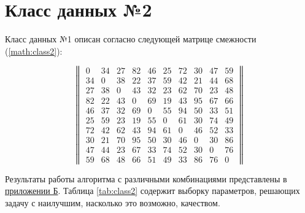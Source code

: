 \section{Класс данных №2}

Класс данных №1 описан согласно следующей матрице смежности (\ref{math:class2}): 

\begin{equation}\label{math:class2}
	\begin{Vmatrix}
		0  & 34 & 27 &  82 &  46 &  25&  72 &  30 &  47 &  59  \\
		34 & 0  & 38 &  22 &  37 &  59&  42 &  21 &  44 &  68  \\
		27 & 38 & 0  & 43  & 32  & 23 & 62  & 70  & 23  & 48  \\
		82 & 22 & 43 &  0  & 69  & 19 & 43  & 95  & 67  & 66  \\
		46 & 37 & 32 &  69 &  0  & 55 & 94  & 50  & 33  & 51  \\
		25 & 59 & 23 &  19 &  55 &  0 & 61  & 30  & 74  & 49  \\
		72 & 42 & 62 &  43 &  94 &  61&  0  & 46  & 52  & 33  \\
		30 & 21 & 70 &  95 &  50 &  30&  46 &  0  & 30  & 86  \\
		47 & 44 & 23 &  67 &  33 &  74&  52 &  30 &  0  & 76  \\
		59 & 68 & 48 &  66 &  51 &  49&  33 &  86 &  76 &  0  
	\end{Vmatrix}
\end{equation}

Результаты работы алгоритма с различными комбинациями представлены в \hyperref[sec:fig2]{приложении Б}. Таблица \ref{tab:class2} содержит выборку параметров, решающих задачу с наилучшим, насколько это возможно, качеством.

